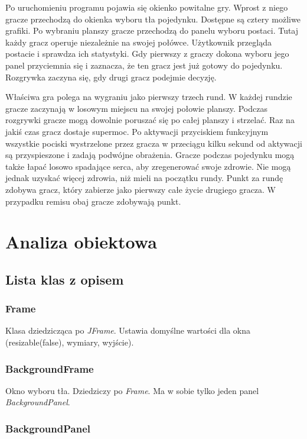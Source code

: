 \documentclass[a4paper,10pt]{article}
\begin{document}
Po uruchomieniu programu pojawia się okienko powitalne gry. Wprost z niego gracze przechodzą do okienka wyboru tła pojedynku. Dostępne są cztery możliwe grafiki. Po wybraniu planszy gracze przechodzą do panelu wyboru postaci. Tutaj każdy gracz operuje niezależnie na swojej połówce. Użytkownik przegląda postacie i sprawdza ich statystyki. Gdy pierwszy z graczy dokona wyboru jego panel przyciemnia się i zaznacza, że ten gracz jest już gotowy do pojedynku. Rozgrywka zaczyna się, gdy drugi gracz podejmie decyzję. 

Właściwa gra polega na wygraniu jako pierwszy trzech rund. W każdej rundzie gracze zaczynają w losowym miejscu na swojej połowie planszy. Podczas rozgrywki gracze mogą dowolnie poruszać się po całej planszy i strzelać. Raz na jakiś czas gracz dostaje supermoc. Po aktywacji przyciskiem funkcyjnym wszystkie pociski wystrzelone przez gracza w przeciągu kilku sekund od aktywacji są przyspieszone i zadają podwójne obrażenia. Gracze podczas pojedynku mogą także łapać losowo spadające serca, aby zregenerować swoje zdrowie. Nie mogą jednak uzyskać więcej zdrowia, niż mieli na początku rundy. Punkt za rundę zdobywa gracz, który zabierze jako pierwszy całe życie drugiego gracza. W przypadku remisu obaj gracze zdobywają punkt.

\section{Analiza obiektowa}
\subsection{Lista klas z opisem}
\subsubsection{Frame}

Klasa dziedzicząca po \textit{JFrame}. Ustawia domyślne wartości dla okna (resizable(false), wymiary, wyjście).

\subsubsection{BackgroundFrame}

Okno wyboru tła. Dziedziczy po \textit{Frame}. Ma w sobie tylko jeden panel \textit{BackgroundPanel}.

\subsubsection{BackgroundPanel}
\end{document}
